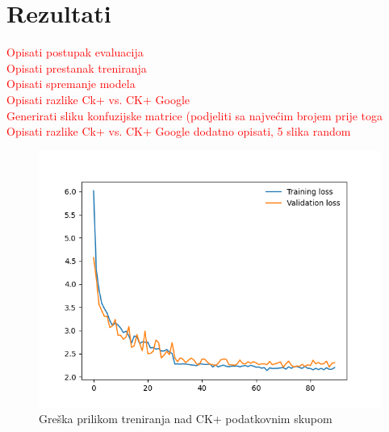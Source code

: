 \documentclass[times, utf8, zavrsni,numeric,pstricks]{fer}
\begin{document}

\chapter{Rezultati}

\textcolor{red}{Opisati postupak evaluacija}\\
\textcolor{red}{Opisati prestanak treniranja}\\
\textcolor{red}{Opisati spremanje modela}\\
\textcolor{red}{Opisati razlike  Ck+ vs. CK+ Google} \\
\textcolor{red}{Generirati sliku konfuzijske matrice (podjeliti sa najvećim brojem prije toga}\\
\textcolor{red}{Opisati razlike  Ck+ vs. CK+ Google} 
\textcolor{red}{dodatno opisati, 5 slika random} 


\begin{figure}[H]
	\centering
	\includegraphics[width=\linewidth, height=0.3\paperheight, keepaspectratio]{val_ck.png}
	\caption{Greška prilikom treniranja nad CK+ podatkovnim skupom}
	\label{loss_ck}
\end{figure}
\end{document}
